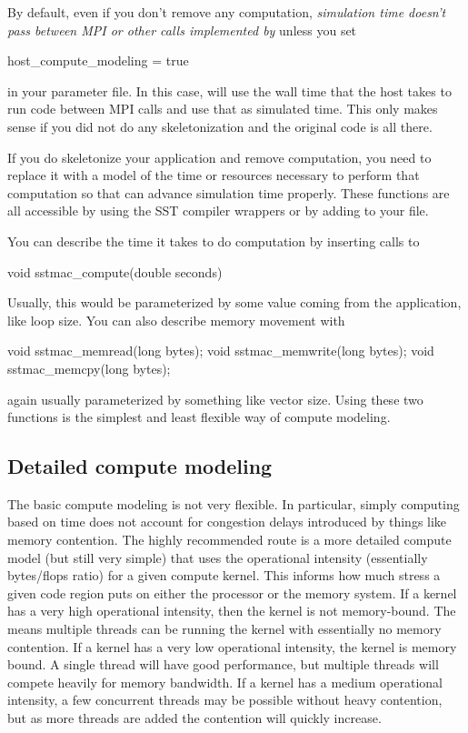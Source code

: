 By default, even if you don't remove any computation, \textit{simulation time doesn't pass between MPI or other calls implemented by \sstmacro} unless you set

\begin{ViFile}
host_compute_modeling = true
\end{ViFile}

in your parameter file.  In this case, \sstmacro will use the wall time that the host takes to run code between MPI calls and use that as simulated time.  This only makes sense if you did not do any skeletonization and the original code is all there. 

If you do skeletonize your application and remove computation, you need to replace it with a model of the time or resources necessary to perform that computation so that \sstmacro can advance simulation time properly. 
These functions are all accessible by using the SST compiler wrappers or by adding  to your file.

You can describe the time it takes to do computation by inserting calls to 

\begin{ViFile}
void sstmac_compute(double seconds)
\end{ViFile}
Usually, this would be parameterized by some value coming from the application, like loop size.   You can also describe memory movement with 

\begin{ViFile}
void sstmac_memread(long bytes);
void sstmac_memwrite(long bytes);
void sstmac_memcpy(long bytes);
\end{ViFile}
again usually parameterized by something like vector size.  
Using these two functions is the simplest and least flexible way of compute modeling.

\subsection{Detailed compute modeling}
\label{subsec:detailedCompute}

The basic compute modeling is not very flexible.  
In particular, simply computing based on time does not account for congestion delays introduced by things like memory contention.
The highly recommended route is a more detailed compute model (but still very simple) that uses the operational intensity (essentially bytes/flops ratio) for a given compute kernel.
This informs \sstmacro how much stress a given code region puts on either the processor or the memory system.
If a kernel has a very high operational intensity, then the kernel is not memory-bound.
The means multiple threads can be running the kernel with essentially no memory contention.
If a kernel has a very low operational intensity, the kernel is memory bound.
A single thread will have good performance, but multiple threads will compete heavily for memory bandwidth.
If a kernel has a medium operational intensity, a few concurrent threads may be possible without heavy contention, 
but as more threads are added the contention will quickly increase.

